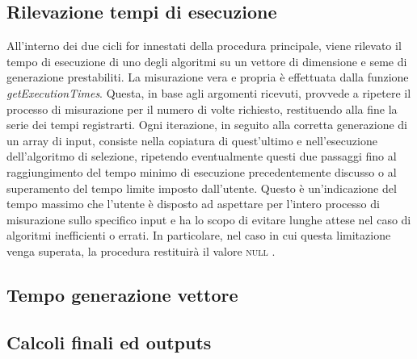 \subsection{Rilevazione tempi di esecuzione}
All’interno dei due cicli for innestati della procedura principale, viene rilevato il 
tempo di esecuzione di uno degli algoritmi su un vettore di dimensione e seme di generazione 
prestabiliti. La misurazione vera e propria è effettuata dalla funzione \textit{\itshape getExecutionTimes}.
Questa, in base agli argomenti ricevuti, provvede a ripetere il processo di misurazione per il 
numero di volte richiesto, restituendo alla fine la serie dei tempi registrarti. 
Ogni iterazione, in seguito alla corretta generazione di un array di input, consiste nella copiatura 
di quest’ultimo e nell’esecuzione dell’algoritmo di selezione, ripetendo eventualmente questi due passaggi 
fino al raggiungimento del tempo minimo di esecuzione precedentemente discusso o al superamento del tempo 
limite imposto dall’utente. Questo è un’indicazione del tempo massimo che l’utente è disposto ad aspettare 
per l’intero processo di misurazione sullo specifico input e ha lo scopo di evitare lunghe attese nel caso di 
algoritmi inefficienti o errati. In particolare, nel caso in cui questa limitazione venga superata, la procedura 
restituirà il valore \textsc{\scshape null} .

\subsection{Tempo generazione vettore}

\subsection{Calcoli finali ed outputs}
